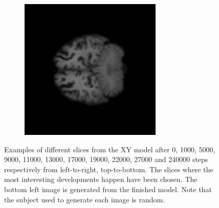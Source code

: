 \documentclass[12pt, fleqn, titlepage]{article}
\newcommand\skipper{1.4pt}
\newcommand{\1}[1]{\mathds{1}\left[#1\right]}
\begin{document}
\begin{figure}[H]
\begin{subfigure}[b]{0.7\textwidth}
		\hskip\skipper
		\includegraphics[width=0.22\linewidth]{imgs/training_progress/XY_model_3T_epoch_1_idx_77000}
	\end{subfigure}
	\caption{Examples of different slices from the XY model after 0, 1000, 5000, 9000, 11000, 13000, 17000, 19000, 22000, 27000 and 240000 steps respectively from left-to-right, top-to-bottom. The slices where the most interesting developments happen have been chosen. The bottom left image is generated from the finished model. Note that the subject used to generate each image is random.}
	\label{fig:training_progress}
\end{figure}
\end{document}
